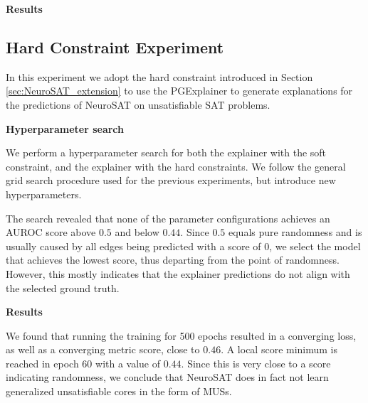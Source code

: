 \textbf{Results}\par


\subsection{Hard Constraint Experiment}
In this experiment we adopt the hard constraint introduced in Section \ref{sec:NeuroSAT_extension} to use the PGExplainer to generate explanations for the predictions of NeuroSAT on unsatisfiable SAT problems. \bigskip

\textbf{Hyperparameter search}\par
We perform a hyperparameter search for both the explainer with the soft constraint, and the explainer with the hard constraints. We follow the general grid search procedure used for the previous experiments, but introduce new hyperparameters. 

The search revealed that none of the parameter configurations achieves an AUROC score above $0.5$ and below $0.44$. Since $0.5$ equals pure randomness and is usually caused by all edges being predicted with a score of $0$, we select the model that achieves the lowest score, thus departing from the point of randomness. However, this mostly indicates that the explainer predictions do not align with the selected ground truth.

\textbf{Results}\par
We found that running the training for 500 epochs resulted in a converging loss, as well as a converging metric score, close to $0.46$. A local score minimum is reached in epoch 60 with a value of $0.44$. Since this is very close to a score indicating randomness, we conclude that NeuroSAT does in fact not learn generalized unsatisfiable cores in the form of MUSs.